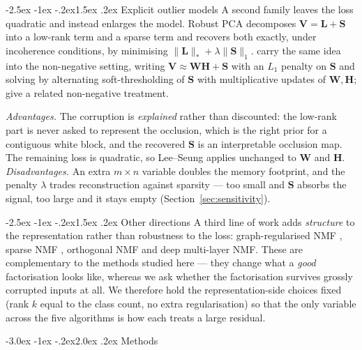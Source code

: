 \documentclass[12pt,a4paper]{article}
\makeatletter
\renewcommand\section{\@startsection{section}{1}{\z@}%
    {-3.0ex \@plus -1ex \@minus -.2ex}{2.0ex \@plus.2ex}%
    {\normalfont\fontsize{13}{15}\bfseries}}
\renewcommand\subsection{\@startsection{subsection}{2}{\z@}%
    {-2.5ex \@plus -1ex \@minus -.2ex}{1.5ex \@plus.2ex}%
    {\normalfont\fontsize{12}{14}\bfseries}}
\newcommand{\bV}{\bm{V}}
\newcommand{\bW}{\bm{W}}
\newcommand{\bH}{\bm{H}}
\newcommand{\bS}{\bm{S}}
\newcommand{\bL}{\bm{L}}
\makeatother
\begin{document}
\subsection{Explicit outlier models}
A second family leaves the loss quadratic and instead enlarges the model.
Robust PCA \citep{candes2011robust} decomposes $\bV = \bL + \bS$ into a
low-rank term and a sparse term and recovers both exactly, under incoherence
conditions, by minimising $\|\bL\|_* + \lambda\|\bS\|_1$.
\citet{zhang2011robust} carry the same idea into the non-negative setting,
writing $\bV \approx \bW\bH + \bS$ with an $L_1$ penalty on $\bS$ and solving
by alternating soft-thresholding of $\bS$ with multiplicative updates of
$\bW, \bH$; \citet{ding2010rpca} give a related non-negative treatment.

\emph{Advantages.} The corruption is \emph{explained} rather than discounted:
the low-rank part is never asked to represent the occlusion, which is the right
prior for a contiguous white block, and the recovered $\bS$ is an interpretable
occlusion map. The remaining loss is quadratic, so Lee--Seung applies unchanged
to $\bW$ and $\bH$.
\emph{Disadvantages.} An extra $m \times n$ variable doubles the memory
footprint, and the penalty $\lambda$ trades reconstruction against sparsity ---
too small and $\bS$ absorbs the signal, too large and it stays empty
(Section~\ref{sec:sensitivity}).

\subsection{Other directions}
A third line of work adds \emph{structure} to the representation rather than
robustness to the loss: graph-regularised NMF \citep{cai2011graph}, sparse NMF
\citep{hoyer2004nonnegative}, orthogonal NMF \citep{ding2006orthogonal} and
deep multi-layer NMF. These are complementary to the methods studied here ---
they change what a \emph{good} factorisation looks like, whereas we ask whether
the factorisation survives grossly corrupted inputs at all. We therefore hold
the representation-side choices fixed (rank $k$ equal to the class count, no
extra regularisation) so that the only variable across the five algorithms is
how each treats a large residual.

\section{Methods}
\label{sec:methods}
\end{document}
